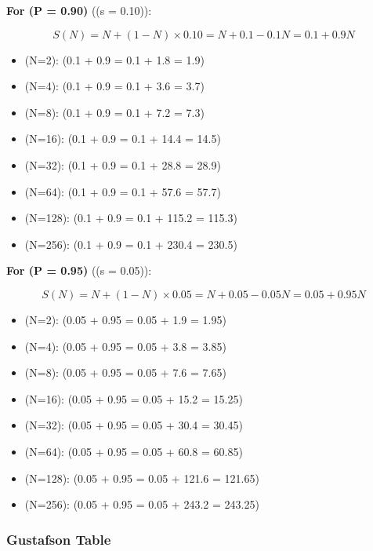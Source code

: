 \documentclass[11pt]{article}
\providecommand{\tightlist}{%
      \setlength{\itemsep}{0pt}\setlength{\parskip}{0pt}}
\begin{document}
\textbf{For (P = 0.90)} ((s = 0.10)):

\[
S(N) = N + (1 - N) \times 0.10 = N + 0.1 - 0.1N = 0.1 + 0.9N
\]

\begin{itemize}
\tightlist
\item
  (N=2): (0.1 + 0.9  = 0.1 + 1.8 = 1.9)
\item
  (N=4): (0.1 + 0.9  = 0.1 + 3.6 = 3.7)
\item
  (N=8): (0.1 + 0.9  = 0.1 + 7.2 = 7.3)
\item
  (N=16): (0.1 + 0.9  = 0.1 + 14.4 = 14.5)
\item
  (N=32): (0.1 + 0.9  = 0.1 + 28.8 = 28.9)
\item
  (N=64): (0.1 + 0.9  = 0.1 + 57.6 = 57.7)
\item
  (N=128): (0.1 + 0.9  = 0.1 + 115.2 = 115.3)
\item
  (N=256): (0.1 + 0.9  = 0.1 + 230.4 = 230.5)
\end{itemize}

\textbf{For (P = 0.95)} ((s = 0.05)):

\[
S(N) = N + (1 - N) \times 0.05 = N + 0.05 - 0.05N = 0.05 + 0.95N
\]

\begin{itemize}
\tightlist
\item
  (N=2): (0.05 + 0.95  = 0.05 + 1.9 = 1.95)
\item
  (N=4): (0.05 + 0.95  = 0.05 + 3.8 = 3.85)
\item
  (N=8): (0.05 + 0.95  = 0.05 + 7.6 = 7.65)
\item
  (N=16): (0.05 + 0.95  = 0.05 + 15.2 = 15.25)
\item
  (N=32): (0.05 + 0.95  = 0.05 + 30.4 = 30.45)
\item
  (N=64): (0.05 + 0.95  = 0.05 + 60.8 = 60.85)
\item
  (N=128): (0.05 + 0.95  = 0.05 + 121.6 = 121.65)
\item
  (N=256): (0.05 + 0.95  = 0.05 + 243.2 = 243.25)
\end{itemize}

\subsubsection{Gustafson Table}\label{gustafson-table}
\end{document}
